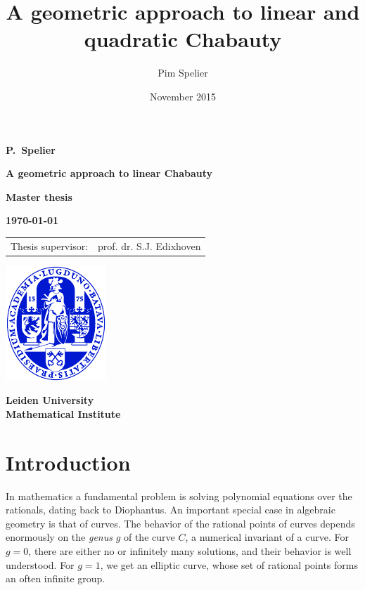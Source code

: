 \documentclass[12pt]{article}
\title{A geometric approach to linear and quadratic Chabauty}
\author{Pim Spelier}
\date{November 2015}
\theoremstyle{plain}
\theoremstyle{definition}
\theoremstyle{remark}
\begin{document}

\vspace*{1em}

\begin{center}

{\Large\bf 
P.\ Spelier
} 

\vspace{1em} 

{\LARGE\bf 
A geometric approach to linear Chabauty
} 

\vspace{10em} 

{\large\bf 
Master thesis
} 

\vspace{1em}

{\large\bf 
\today
}

\vspace{10em} 

{\large\bf
\begin{tabular}{ll}
Thesis supervisor: & prof. dr. S.J. Edixhoven\\
\end{tabular}
}

\vfill

\includegraphics{ulzegel_blauw}\\

\vspace{2em}

{\large\bf 
Leiden University\\
Mathematical Institute\\
}

\end{center}
\thispagestyle{empty}
\newpage
\listoftodos
\tableofcontents
\newpage


\section{Introduction}
\label{section:intro}
In mathematics a fundamental problem is solving polynomial equations over the rationals, dating back to Diophantus. An important special case in algebraic geometry is that of curves. The behavior of the rational points of curves depends enormously on the \textit{genus} $g$ of the curve $C$, a numerical invariant of a curve. For $g = 0$, there are either no or infinitely many solutions, and their behavior is well understood. For $g = 1$, we get an elliptic curve, whose set of rational points forms an often infinite group.
\end{document}
